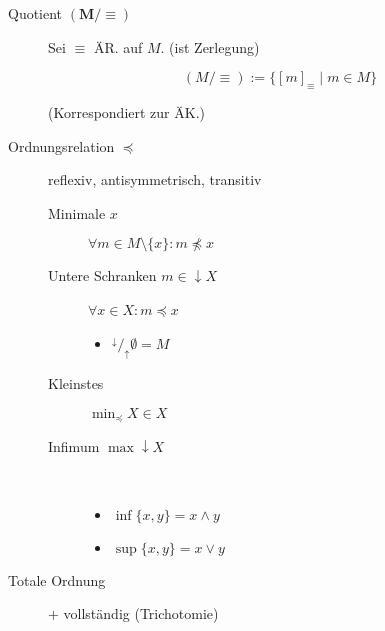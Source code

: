 \begin{mzImportant}
\begin{description}
    \item [Quotient $\mathbf{(M / \equiv)}$]
          Sei $\equiv$ ÄR. auf $M$. (ist Zerlegung)

          $$(M / \equiv) := \{ [m]_\equiv \mid m \in M \}$$

          (Korrespondiert zur ÄK.)

    \item [Ordnungsrelation $\boldsymbol{\preceq}$]
          reflexiv, antisymmetrisch, transitiv

          \begin{description}
            \item [Minimale $x$] $\forall m \in M \setminus \{ x \}: m \not\preceq x$

            \item [Untere Schranken $m \in \downarrow X$] $\forall x \in X: m \preceq x$\

                  \begin{itemize}
                    \item ${}^{\downarrow}/_{\uparrow} \emptyset = M$
                  \end{itemize}

            \item [Kleinstes] $\min_\preceq X \in X$

            \item [Infimum $\max \downarrow X$]\
                  \index{Supremum}

                  \begin{itemize}
                    \item $\inf \{ x, y \} = x \land y$
                    \item $\sup \{ x, y \} = x \lor y$
                  \end{itemize}
          \end{description}

    \item [Totale Ordnung] $+$ vollständig (Trichotomie)
  \end{description}
\end{mzImportant}

